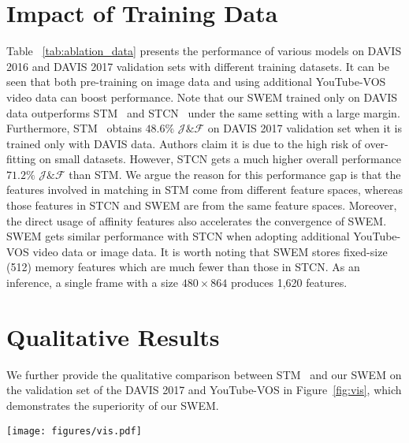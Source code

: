 \section{Impact of Training Data}
\label{sec:TrainingData}
Table ~\ref{tab:ablation_data} presents the performance of various models on DAVIS 2016 and DAVIS 2017 validation sets with different training datasets. 
It can be seen that both pre-training on image data and using additional YouTube-VOS video data can boost performance. Note that our SWEM trained only on DAVIS data outperforms STM~\cite{Oh_2019_ICCV} and STCN~\cite{cheng2021stcn} under the same setting with a large margin. Furthermore, STM~\cite{Oh_2019_ICCV} obtains $48.6\%$ $\mathcal{J}\&\mathcal{F}$ on DAVIS 2017 validation set when it is trained only with DAVIS data. Authors claim it is due to the high risk of over-fitting on small datasets. However, STCN gets a much higher overall performance $71.2\%$ $\mathcal{J}\&\mathcal{F}$ than STM. We argue the reason for this performance gap is that the features involved in matching in STM come from different feature spaces, whereas those features in STCN and SWEM are from the same feature spaces. Moreover, the direct usage of affinity features also accelerates the convergence of SWEM. SWEM gets similar performance with STCN when adopting additional YouTube-VOS video data or image data. It is worth noting that SWEM stores fixed-size (512) memory features which are much fewer than those in STCN. As an inference, a single frame with a size $480\times 864$ produces 1,620 features.

\section{Qualitative Results}
\label{sec:qualitative}
We further provide the qualitative comparison between STM~\cite{Oh_2019_ICCV} and our SWEM on the validation set of the DAVIS 2017 and YouTube-VOS in Figure~\ref{fig:vis}, which demonstrates the superiority of our SWEM. 

\begin{figure*}[h]
\begin{center}
\texttt{[image: figures/vis.pdf]}
\end{center}
\vspace{-0.0 cm}
   \caption{The qualitative comparison between STM~\cite{Oh_2019_ICCV} and our SWEM on the DAVIS 2017 and YouTube-VOS. The obvious failure segmentation is indicated by yellow bounding boxes. Our SWEM is robust with rapid motion and similar distractors.}
\label{fig:vis}
\vspace{-0.0 cm}
\end{figure*}

